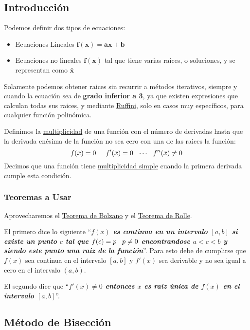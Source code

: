 \subsection{Introducción}
 Podemos definir dos tipos de ecuaciones:
\begin{itemize}
        \item Ecuaciones Lineales \(\mathbf{f(x) = ax +b}\)
        \item Ecuaciones no lineales \(\mathbf{f(x)}\) tal que tiene varias raices, o soluciones, y se representan como \(\mathbf{\bar{x}}\)
\end{itemize}
 Solamente podemos obtener raices sin recurrir a métodos iterativos, siempre y cuando la ecuación sea de \textbf{grado inferior a 3}, ya que existen expresiones que calculan todas sus raices, y mediante \underline{Ruffini}, solo en casos muy específicos, para cualquier función polinómica.
\par
\vspace{.5cm}
 Definimos la \underline{multiplicidad} de una función con el número de derivadas hasta que la derivada enésima de la función no sea cero con una de las raices la función:
\[
        f(\bar{x}) = 0 \hspace{5mm}f'(\bar{x}) = 0 \hspace{2.5mm} \cdots \hspace{2.5mm} f^n(\bar{x}) \not = 0
\]
Decimos que una función tiene \underline{multiplicidad simple} cuando la primera derivada cumple esta condición.
\subsubsection{Teoremas a Usar}
 Aprovecharemos el \underline{Teorema de Bolzano} y el \underline{Teorema de Rolle}.\par \vspace{5mm}
 El primero dice lo siguiente ``\textbf{\textit{\(f(x)\) es continua en un intervalo \([a,b]\) si existe un punto \(c\) tal que \(f(c) = p \hspace{3mm} p \neq 0\) encontrandose \(a < c < b\) y siendo este punto una raiz de la función}}''. Para esto debe de cumplirse que \(f(x)\) sea continua en el intervalo \([a,b]\) y \(f'(x)\) sea derivable y no sea igual a cero en el intervalo \((a,b)\). \par \vspace{3mm}
 El segundo dice que ``\textbf{\textit{\(f'(x) \neq 0 \) entonces \(x\) es raiz única de \(f(x)\) en el intervalo \([a,b]\)}}''.
\subsection{Método de Bisección}

